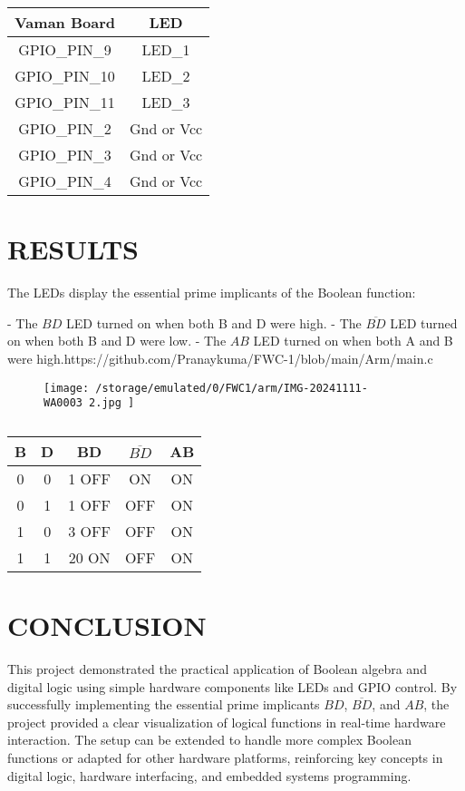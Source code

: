 \documentclass[conference]{IEEEtran}
\begin{document}
\begin{table}[htbp]
\centering
\begin{tabular}{|c|c|}
\hline
Vaman Board & LED \\ \hline
GPIO\_PIN\_9 & LED\_1 \\ \hline
GPIO\_PIN\_10 & LED\_2 \\ \hline
GPIO\_PIN\_11 & LED\_3 \\ \hline
GPIO\_PIN\_2 & Gnd or Vcc \\ \hline
GPIO\_PIN\_3 & Gnd or Vcc \\ \hline
GPIO\_PIN\_4 & Gnd or Vcc \\ \hline
\end{tabular}
\vspace{0.1cm}
\caption{\label{tab:widgets}}
\end{table}

\section{RESULTS}
The LEDs display the essential prime implicants of the Boolean function:

- The $BD$ LED turned on when both B and D were high.
- The $\overline{BD}$ LED turned on when both B and D were low.
- The $AB$ LED turned on when both A and B were high.https://github.com/Pranaykuma/FWC-1/blob/main/Arm/main.c

\begin{figure}[h]
\centering
\texttt{[image: /storage/emulated/0/FWC1/arm/IMG-20241111-WA0003~2.jpg   ]}
\caption{\label{fig:Gates}}
\end{figure}

\begin{table}[htbp]
\centering
\begin{tabular}{|c|c|c|c|c|} \hline
B & D & BD & $\overline{BD}$ & AB \\ \hline
0 & 0 & 1 OFF & ON & ON \\ \hline
0 & 1 & 1 OFF & OFF & ON \\ \hline
1 & 0 & 3 OFF & OFF & ON \\ \hline
1 & 1 & 20 ON & OFF & ON \\ \hline
\end{tabular}
\vspace{0.1cm}
\caption{\label{tab:widgets}}
\end{table}

\section{CONCLUSION}
This project demonstrated the practical application of Boolean algebra and digital logic using simple hardware components like LEDs and GPIO control. By successfully implementing the essential prime implicants $BD$, $\overline{BD}$, and $AB$, the project provided a clear visualization of logical functions in real-time hardware interaction. The setup can be extended to handle more complex Boolean functions or adapted for other hardware platforms, reinforcing key concepts in digital logic, hardware interfacing, and embedded systems programming.
\end{document}
